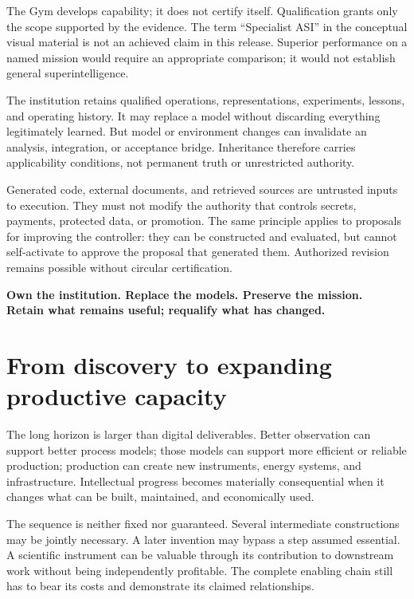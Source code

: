 \documentclass[11pt,letterpaper]{article}
\theoremstyle{remark}\newtheorem{remark}{Remark}[section]
\newenvironment{keyidea}{\begin{thesisbox}\bfseries}{\end{thesisbox}}
\begin{document}
The Gym develops capability; it does not certify itself. Qualification grants only the scope supported by the evidence. The term ``Specialist ASI'' in the conceptual visual material is not an achieved claim in this release. Superior performance on a named mission would require an appropriate comparison; it would not establish general superintelligence.

The institution retains qualified operations, representations, experiments, lessons, and operating history. It may replace a model without discarding everything legitimately learned. But model or environment changes can invalidate an analysis, integration, or acceptance bridge. Inheritance therefore carries applicability conditions, not permanent truth or unrestricted authority.

Generated code, external documents, and retrieved sources are untrusted inputs to execution. They must not modify the authority that controls secrets, payments, protected data, or promotion. The same principle applies to proposals for improving the controller: they can be constructed and evaluated, but cannot self-activate to approve the proposal that generated them. Authorized revision remains possible without circular certification.

\begin{keyidea}
Own the institution. Replace the models. Preserve the mission.\\
Retain what remains useful; requalify what has changed.
\end{keyidea}

\section{From discovery to expanding productive capacity}\label{sec:horizon}
The long horizon is larger than digital deliverables. Better observation can support better process models; those models can support more efficient or reliable production; production can create new instruments, energy systems, and infrastructure. Intellectual progress becomes materially consequential when it changes what can be built, maintained, and economically used.

The sequence is neither fixed nor guaranteed. Several intermediate constructions may be jointly necessary. A later invention may bypass a step assumed essential. A scientific instrument can be valuable through its contribution to downstream work without being independently profitable. The complete enabling chain still has to bear its costs and demonstrate its claimed relationships.
\end{document}
